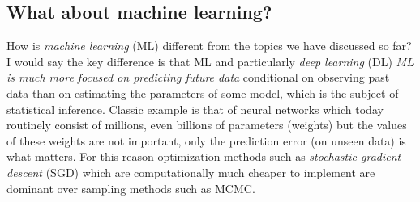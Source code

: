 \documentclass[12pt,dvipsnames]{report}
\renewcommand{\vec}[1]{\boldsymbol{\mathbf{#1}}}
\begin{document}
%


\subsection{What about machine learning?}
How is \textsl{machine learning} (ML) different from the topics we have discussed so far? 
I would say the key difference is that ML and particularly \textsl{deep learning} (DL) 
\emph{ML is much more focused on predicting future data} conditional on observing 
past data  than on estimating the parameters of some model, which is the subject of 
statistical inference. Classic example is that of neural networks which 
today routinely consist of millions, even billions of parameters (weights) but 
the  values of these weights are not important, only the prediction error 
(on unseen data) is what matters. For this reason optimization methods such as 
\textsl{stochastic gradient descent} (SGD) which are computationally much 
cheaper to implement are dominant over sampling methods such as MCMC.
\end{document}
